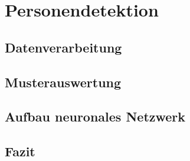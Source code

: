 \chapter{Personendetektion}
\label{chap:Personendetektion}




\section{Datenverarbeitung}



\section{Musterauswertung}



\section{Aufbau neuronales Netzwerk}






\section{Fazit}